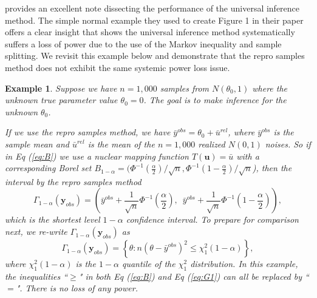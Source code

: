 \documentclass[12pt]{article}
\theoremstyle{shortspace}
\newtheorem{example}{\quad Example}
\begin{document}
\cite{TseDavison2023} provides an excellent note dissecting the performance of the universal inference method. The simple normal example they used to create Figure 1 in their paper offers a clear insight that shows the universal inference method systematically suffers a loss of power due to the use of the Markov inequality and sample splitting. We revisit this example below and demonstrate that the repro samples method does not exhibit the same systemic power loss issue.

\begin{example}
\label{ex:universal}
\citep[][Example setting for Figure 1]{TseDavison2023}
  Suppose we have $n = 1{,}000$ samples from $N(\theta_0, 1)$ where the unknown true parameter value $\theta_0 =0$. The goal is to make inference for the unknown $\theta_0$.

 If we use the repro samples method, we have $\bar y^{obs} = \theta_0 + \bar u^{rel}$, where $\bar y^{obs}$ is the sample mean and $\bar u^{rel}$ is the mean of the $n = 1,000$ realized $N(0,1)$ noises. So if in Eq (\ref{eq:B}) we use a nuclear mapping function $T(\mathbf{u}) = \bar u$ with a corresponding Borel set $B_{1-\alpha} = 
 (\Phi^{-1}(\frac \alpha2)/\sqrt{n}, \Phi^{-1}(1 - \frac \alpha2)/\sqrt{n}$), 
 then the interval by the repro samples method $$\Gamma_{1 - \alpha}(\mathbf{y}_{obs}) = \left(\bar y^{obs} + \frac1{\sqrt{n}}\Phi^{-1}(\frac \alpha2), \,\,\, \bar y^{obs} + \frac1{\sqrt{n}} \Phi^{-1}(1 - \frac \alpha2)\right), $$ which is the shortest level $1 - \alpha$ confidence interval. To prepare for comparison next, we re-write $\Gamma_{1 - \alpha}(\mathbf{y}_{obs})$ as 
 \begin{equation}
 \label{eq:universal-repro-example}
 \Gamma_{1 - \alpha}(\mathbf{y}_{obs}) = \left\{ \theta: 
 n(\theta - \bar y^{obs})^2 \leq  \chi_1^2(1 - \alpha) \right\}, 
 \end{equation}
 where $\chi_1^2(1 - \alpha)$ is the $1 - \alpha$ quantile of the $\chi_1^2$ distribution.  In this example, the inequalities ``$\ge$" in both Eq (\ref{eq:B}) and Eq (\ref{eq:G1}) can all be replaced by ``$=$".  There is no loss of any power. 


\end{example}
\end{document}
